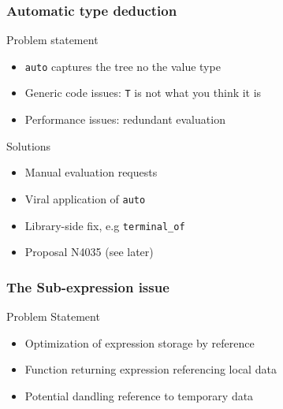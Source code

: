 
{
}

\begin{frame}
\frametitle{Automatic type deduction}
\begin{block}{Problem statement}
\begin{itemize}
\item \texttt{auto} captures the tree no the value type
\item Generic code issues: \texttt{T} is not what you think it is
\item Performance issues: redundant evaluation
\end{itemize}
\end{block}{}
{
\lstautoissue
}

{
\lstgenericissue
}

{
\lstmultieval
}

{
\begin{block}{Solutions}
\begin{itemize}
\item Manual evaluation requests
\item Viral application of \texttt{auto}
\item Library-side fix, e.g \texttt{terminal\_of}
\item Proposal N4035 (see later)
\end{itemize}
\end{block}{}
}

\end{frame}

\begin{frame}
\frametitle{The Sub-expression issue}
\begin{block}{Problem Statement}
\begin{itemize}
\item Optimization of expression storage by reference
\item Function returning expression referencing local data
\item Potential dandling reference to temporary data
\end{itemize}
\end{block}{}

\lstdang

\end{frame}

